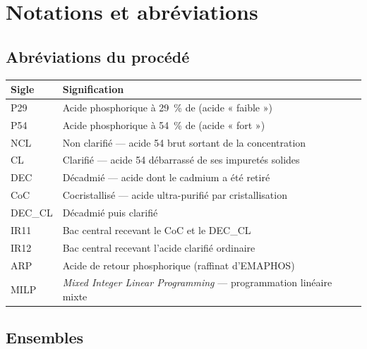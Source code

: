 \chapter*{Notations et abréviations}

\section*{Abréviations du procédé}

\begin{longtable}{@{}ll@{}}
\toprule
\textbf{Sigle} & \textbf{Signification} \\
\midrule
\endhead
P29 & Acide phosphorique à \SI{29}{\percent} de \PdeuxOcinq{} (acide « faible ») \\
P54 & Acide phosphorique à \SI{54}{\percent} de \PdeuxOcinq{} (acide « fort ») \\
NCL & Non clarifié --- acide 54 brut sortant de la concentration \\
CL & Clarifié --- acide 54 débarrassé de ses impuretés solides \\
DEC & Décadmié --- acide dont le cadmium a été retiré \\
CoC & Cocristallisé --- acide ultra-purifié par cristallisation \\
DEC\_CL & Décadmié puis clarifié \\
IR11 & Bac central recevant le CoC et le DEC\_CL \\
IR12 & Bac central recevant l'acide clarifié ordinaire \\
ARP & Acide de retour phosphorique (raffinat d'EMAPHOS) \\
MILP & \emph{Mixed Integer Linear Programming} --- programmation linéaire mixte \\
\bottomrule
\end{longtable}

\section*{Ensembles}

